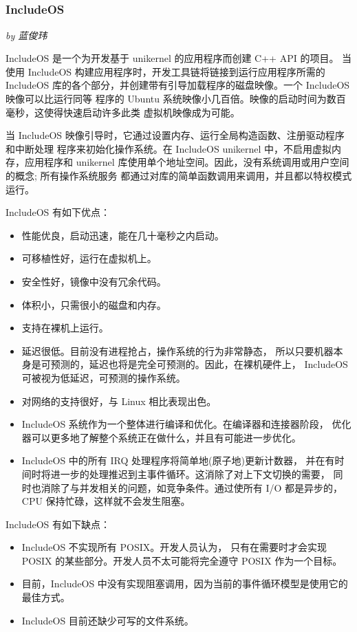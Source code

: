 \documentclass[UTF8,fontset=none,linespread=1.15]{ctexart}
\let\nosupcite\cite
\renewcommand*{\cite}[1]{\textsuperscript{\nosupcite{#1}}}
\newcommand{\sectionauthor}[1]{%
\vspace*{-5ex}
\noindent\textrm{\hfill\textit{by #1}}
\vspace*{3ex}\par}
\begin{document}
\subsubsection[IncludeOS]{IncludeOS\cite{bib:9-includeos}\cite{bib:10-includeos2}}\sectionauthor{蓝俊玮}

IncludeOS 是一个为开发基于 unikernel 的应用程序而创建 C++ API 的项目。
当使用 IncludeOS 构建应用程序时，开发工具链将链接到运行应用程序所需的 IncludeOS
库的各个部分，并创建带有引导加载程序的磁盘映像。一个 IncludeOS 映像可以比运行同等
程序的 Ubuntu 系统映像小几百倍。映像的启动时间为数百毫秒，这使得快速启动许多此类
虚拟机映像成为可能。

当 IncludeOS 映像引导时，它通过设置内存、运行全局构造函数、注册驱动程序和中断处理
程序来初始化操作系统。在 IncludeOS unikernel 中，不启用虚拟内存，应用程序和
 unikernel 库使用单个地址空间。因此，没有系统调用或用户空间的概念; 所有操作系统服务
 都通过对库的简单函数调用来调用，并且都以特权模式运行。

IncludeOS 有如下优点：
\begin{itemize}
\item 性能优良，启动迅速，能在几十毫秒之内启动。
\item 可移植性好，运行在虚拟机上。
\item 安全性好，镜像中没有冗余代码。
\item 体积小，只需很小的磁盘和内存。
\item 支持在裸机上运行。
\item 延迟很低。目前没有进程抢占，操作系统的行为非常静态，
所以只要机器本身是可预测的，延迟也将是完全可预测的。因此，在裸机硬件上，
IncludeOS可被视为低延迟，可预测的操作系统。
\item 对网络的支持很好，与 Linux 相比表现出色。
\item IncludeOS 系统作为一个整体进行编译和优化。在编译器和连接器阶段，
优化器可以更多地了解整个系统正在做什么，并且有可能进一步优化。
\item IncludeOS 中的所有 IRQ 处理程序将简单地(原子地)更新计数器，
并在有时间时将进一步的处理推迟到主事件循环。这消除了对上下文切换的需要，
同时也消除了与并发相关的问题，如竞争条件。通过使所有 I/O 都是异步的，CPU 保持忙碌，这样就不会发生阻塞。
\end{itemize}

IncludeOS 有如下缺点：
\begin{itemize}
\item IncludeOS 不实现所有 POSIX。开发人员认为，
只有在需要时才会实现 POSIX 的某些部分。开发人员不太可能将完全遵守 POSIX 作为一个目标。
\item 目前，IncludeOS 中没有实现阻塞调用，因为当前的事件循环模型是使用它的最佳方式。
\item IncludeOS 目前还缺少可写的文件系统。
\end{itemize}
\end{document}
